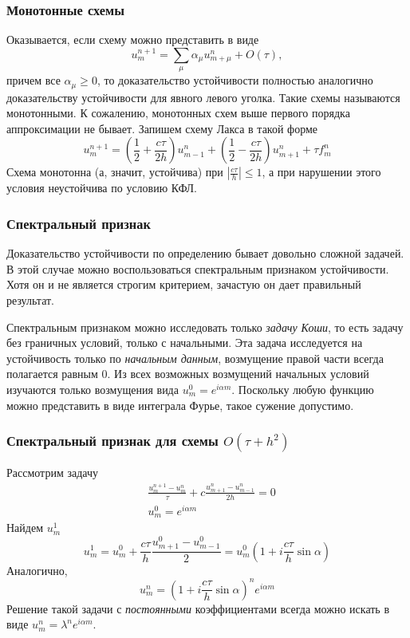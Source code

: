 \documentclass[professionalfonts,compress,unicode,aspectratio=169]{beamer}
\begin{document}
\begin{frame}\frametitle{Монотонные схемы}
	Оказывается, если схему можно представить в виде
	\[
	u^{n+1}_m = \sum_{\mu} \alpha_\mu u^n_{m+\mu} + O(\tau),
	\]
	причем все $\alpha_\mu \geqslant 0$, то доказательство устойчивости полностью аналогично доказательству устойчивости для явного левого уголка.
	Такие схемы называются монотонными. К сожалению, монотонных схем выше первого порядка аппроксимации не бывает. Запишем схему Лакса в такой форме
	\[
	u^{n+1}_m = \left(\frac{1}{2}+\frac{c\tau}{2h}\right) u^n_{m-1} +
\left(\frac{1}{2}-\frac{c\tau}{2h}\right) u^n_{m+1} + \tau f^n_m
	\]
	Схема монотонна (а, значит, устойчива) при $\left|\frac{c\tau}{h}\right| \leqslant 1$, а при нарушении этого условия неустойчива по условию КФЛ.
\end{frame}

\begin{frame}\frametitle{Спектральный признак}
	Доказательство устойчивости по определению бывает довольно сложной задачей. 
	В этой случае можно воспользоваться спектральным признаком устойчивости. Хотя он и не является
	строгим критерием, зачастую он дает правильный результат.
	
	Спектральным признаком можно исследовать только \emph{задачу Коши}, то есть задачу без граничных условий, только 
	с начальными. Эта задача исследуется на устойчивость только по
\emph{начальным данным}, возмущение правой части всегда полагается равным $0$.
	Из всех возможных возмущений начальных условий изучаются только возмущения вида $u^0_m = e^{i\alpha m}$. Поскольку 
	любую функцию можно представить в виде интеграла Фурье, такое сужение допустимо.
\end{frame}

\begin{frame}\frametitle{Спектральный признак для схемы $O(\tau+h^2)$}
	Рассмотрим задачу 
	\begin{align*}
	&\frac{u_m^{n+1}-u^n_m}{\tau} + c\frac{u^n_{m+1}-u^n_{m-1}}{2h} = 0\\
	&u^0_m = e^{i \alpha m}
	\end{align*}
	Найдем $u^1_m$
	\[
	u^1_m = u^0_m + \frac{c\tau}{h}\frac{u^0_{m+1}-u^0_{m-1}}{2} = u^0_m \left(1 + i \frac{c\tau}{h} \sin \alpha\right)
	\]
	Аналогично,
	\[
	u^n_m = \left(1 + i \frac{c\tau}{h} \sin \alpha\right)^n e^{i\alpha m}
	\]
	Решение такой задачи с \emph{постоянными} коэффициентами всегда можно искать в виде $u^n_m = \lambda^n e^{i \alpha m}$.
\end{frame}
\end{document}
